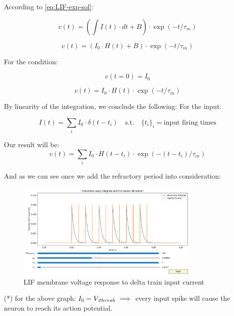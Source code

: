 According to \ref{eq:LIF-exp-sol}:

\begin{equation}
	v(t) = (\int I(t) \cdot dt + B) \cdot \exp(-t/\tau_m)
\end{equation}

\begin{equation}
	v(t) = (I_0 \cdot H(t) + B) \cdot \exp(-t/\tau_m)
\end{equation}

For the condition: 

\begin{equation}
	v(t=0) = I_0
\end{equation}

\begin{equation}
	v(t) = I_0 \cdot H(t) \cdot \exp(-t/\tau_m)
\end{equation}

By linearity of the integration, we conclude the following:
For the input:

\begin{equation}
	I(t) = \sum_i I_0 \cdot \delta(t-t_i) \quad \text{s.t.} \quad \{t_i\}_i = \text{input firing times}
\end{equation}

Our result will be:
\begin{equation}
	v(t) = \sum_i I_0 \cdot H(t-t_i) \cdot \exp(-(t-t_i)/\tau_m) \label{eq:LIF-spike-sol}
\end{equation}

And as we can see once we add the refractory period into consideration:

\begin{figure}[H]
    \centering
    \includegraphics[width=0.8\textwidth]{methods/computational-models/graphs/LIF-spike-response-ref.png}
    \caption{LIF membrane voltage response to delta train input current}
    \label{fig:LIF-spike-ref}
\end{figure}

(*) for the above graph: \( I_0=V_{\text:thresh} \implies \) every input spike will cause the neuron to reach its action potential.

